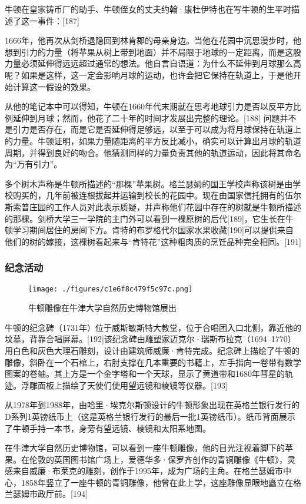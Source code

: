 牛顿在皇家铸币厂的助手、牛顿侄女的丈夫约翰·康杜伊特也在写牛顿的生平时描述了这一事件：[187]

1666年，他再次从剑桥退隐回到林肯郡的母亲身边。当他在花园中沉思漫步时，他想到引力的力量（将苹果从树上带到地面）并不局限于地球的一定距离，而是这股力量必须延伸得远远超过通常的想法。他自言自语道：为什么不延伸到月球那么高呢？如果是这样，这一定会影响月球的运动，也许会把它保持在轨道上，于是他开始计算这一假设的效果。

从他的笔记本中可以得知，牛顿在1660年代末期就在思考地球引力是否以反平方比例延伸到月球；然而，他花了二十年的时间才发展出完整的理论。[188] 问题并不是引力是否存在，而是它是否延伸得足够远，以至于可以成为将月球保持在轨道上的力量。牛顿证明，如果力量随距离的平方反比减小，确实可以计算出月球的轨道周期，并得到良好的吻合。他猜测同样的力量负责其他的轨道运动，因此将其命名为“万有引力”。

多个树木声称是牛顿所描述的“那棵”苹果树。格兰瑟姆的国王学校声称该树是由学校购买的，几年前被连根拔起并运输到校长的花园中。现在由国家信托拥有的伍尔斯索普庄园的工作人员对此表示质疑，并声称他们花园中存在的树就是牛顿所描述的那棵。剑桥大学三一学院的主门外可以看到一棵原树的后代[189]，它生长在牛顿学习期间居住的房间下方。肯特的布罗格代尔国家水果收藏[190]可以提供来自他们的树的嫁接，这棵树看起来与“肯特花”这种粗肉质的烹饪品种完全相同。[191]
\subsubsection{纪念活动}
\begin{figure}[ht]
\centering
\texttt{[image: ./figures/c1e6f8c479f5c97c.png]}
\caption{牛顿雕像在牛津大学自然历史博物馆展出} \label{fig_Newton_14}
\end{figure}
牛顿的纪念碑（1731年）位于威斯敏斯特大教堂，位于合唱团入口北侧，靠近他的坟墓，背靠合唱屏幕。[192]该纪念碑由雕塑家迈克尔·瑞斯布拉克（1694–1770）用白色和灰色大理石雕刻，设计由建筑师威廉·肯特完成。纪念碑上描绘了牛顿的雕像，斜卧在一个石棺上，右肘支撑在几本重要的书籍上，左手指向一卷带有数学图案的卷轴。其上方是一个金字塔和一个天球，显示了黄道带和1680年彗星的轨迹。浮雕面板上描绘了天使们使用望远镜和棱镜等仪器。[193]

从1978年到1988年，由哈里·埃克尔斯顿设计的牛顿形象出现在英格兰银行发行的D系列1英镑纸币上（这是英格兰银行发行的最后一批1英镑纸币）。纸币背面展示了牛顿手持一本书，身旁有望远镜、棱镜和太阳系地图。

在牛津大学自然历史博物馆，可以看到一座牛顿雕像，他的目光注视着脚下的苹果。在伦敦的英国图书馆广场上，爱德华多·保罗齐创作的青铜雕像《牛顿》，灵感来自威廉·布莱克的雕刻，创作于1995年，成为广场的主角。在格兰瑟姆市中心，1858年竖立了一座牛顿的青铜雕像，他曾在此上学，这座雕像显眼地矗立在格兰瑟姆市政厅前。[194]

